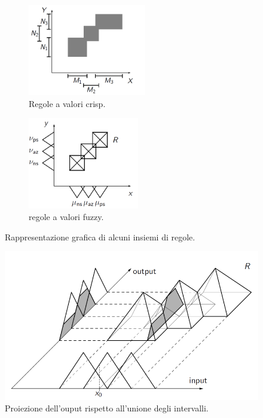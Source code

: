 \documentclass[10pt,a4paper]{article}
\begin{document}
 
\begin{figure}

\begin{subfigure}{0.5\textwidth}
\includegraphics[width=0.9\linewidth, height=4cm]{img/rulesfuzzy.png} 
\caption{Regole a valori crisp.}
\end{subfigure} %
\begin{subfigure}{0.5\textwidth}
\includegraphics[width=0.9\linewidth, height=4cm]{img/fuzrule.png}
\caption{regole a valori fuzzy.}
\end{subfigure} 

\caption{Rappresentazione grafica di alcuni insiemi di regole.}
\label{fig:31}
\end{figure}


\begin{figure}
\centering
\includegraphics[scale=0.3]{img/outputrules.png}
\caption{Proiezione dell'ouput rispetto all'unione degli intervalli.}
\label{fig:32}
\end{figure}
\end{document}
